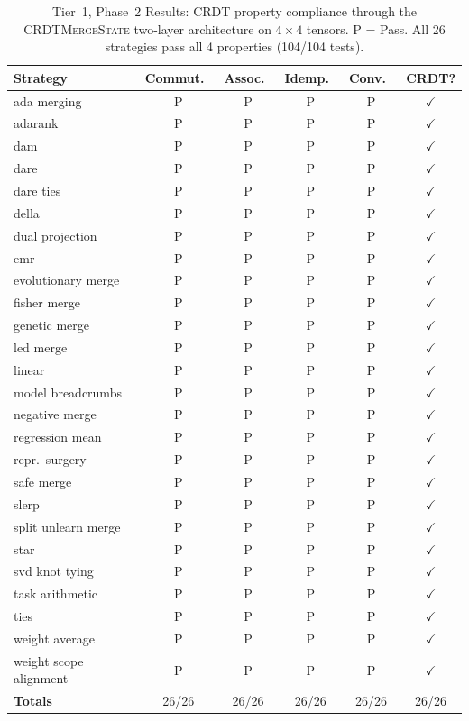 \documentclass[10pt,letterpaper]{article}
\newcommand{\CMS}{\texorpdfstring{{\mdseries\upshape\textsc{CRDTMergeState}}}{CRDTMergeState}}
\begin{document}
\begin{table}[t]
\centering
\caption{Tier~1, Phase~2 Results: CRDT property compliance through the \CMS{} two-layer architecture on $4\times 4$ tensors. P = Pass. All 26 strategies pass all 4 properties (104/104 tests).}
\label{tab:phase2_controlled}
\small
\begin{tabular}{lccccc}
\toprule
Strategy & Commut.\ & Assoc.\ & Idemp.\ & Conv.\ & CRDT?\\
\midrule
ada merging        & P & P & P & P & $\checkmark$ \\
adarank            & P & P & P & P & $\checkmark$ \\
dam                & P & P & P & P & $\checkmark$ \\
dare               & P & P & P & P & $\checkmark$ \\
dare ties          & P & P & P & P & $\checkmark$ \\
della              & P & P & P & P & $\checkmark$ \\
dual projection    & P & P & P & P & $\checkmark$ \\
emr                & P & P & P & P & $\checkmark$ \\
evolutionary merge & P & P & P & P & $\checkmark$ \\
fisher merge       & P & P & P & P & $\checkmark$ \\
genetic merge      & P & P & P & P & $\checkmark$ \\
led merge          & P & P & P & P & $\checkmark$ \\
linear             & P & P & P & P & $\checkmark$ \\
model breadcrumbs  & P & P & P & P & $\checkmark$ \\
negative merge     & P & P & P & P & $\checkmark$ \\
regression mean    & P & P & P & P & $\checkmark$ \\
repr.\ surgery & P & P & P & P & $\checkmark$ \\
safe merge         & P & P & P & P & $\checkmark$ \\
slerp              & P & P & P & P & $\checkmark$ \\
split unlearn merge & P & P & P & P & $\checkmark$ \\
star               & P & P & P & P & $\checkmark$ \\
svd knot tying     & P & P & P & P & $\checkmark$ \\
task arithmetic    & P & P & P & P & $\checkmark$ \\
ties               & P & P & P & P & $\checkmark$ \\
weight average     & P & P & P & P & $\checkmark$ \\
weight scope alignment & P & P & P & P & $\checkmark$ \\
\midrule
\textbf{Totals}    & 26/26 & 26/26 & 26/26 & 26/26 & 26/26 \\
\bottomrule
\end{tabular}
\end{table}
\end{document}
